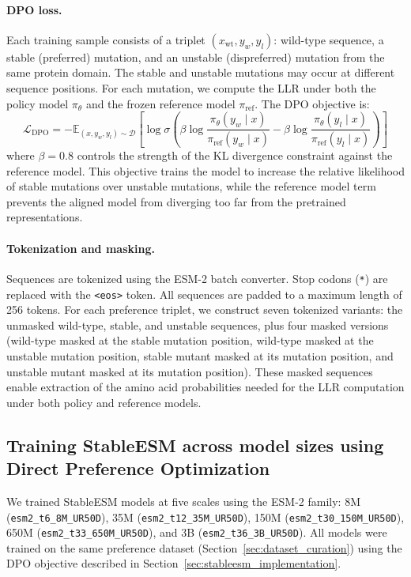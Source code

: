 \paragraph{DPO loss.}
Each training sample consists of a triplet $(x_{\text{wt}}, y_w, y_l)$: wild-type sequence, a stable (preferred) mutation, and an unstable (dispreferred) mutation from the same protein domain.
The stable and unstable mutations may occur at different sequence positions.
For each mutation, we compute the LLR under both the policy model $\pi_\theta$ and the frozen reference model $\pi_{\text{ref}}$.
The DPO objective is:
\begin{equation}
\mathcal{L}_{\text{DPO}} = -\mathbb{E}_{(x, y_w, y_l) \sim \mathcal{D}} \left[ \log \sigma \left( \beta \log \frac{\pi_\theta(y_w \mid x)}{\pi_{\text{ref}}(y_w \mid x)} - \beta \log \frac{\pi_\theta(y_l \mid x)}{\pi_{\text{ref}}(y_l \mid x)} \right) \right]
\end{equation}
where $\beta = 0.8$ controls the strength of the KL divergence constraint against the reference model.
This objective trains the model to increase the relative likelihood of stable mutations over unstable mutations, while the reference model term prevents the aligned model from diverging too far from the pretrained representations.

\paragraph{Tokenization and masking.}
Sequences are tokenized using the ESM-2 batch converter.
Stop codons (\texttt{*}) are replaced with the \texttt{<eos>} token.
All sequences are padded to a maximum length of 256 tokens.
For each preference triplet, we construct seven tokenized variants: the unmasked wild-type, stable, and unstable sequences, plus four masked versions (wild-type masked at the stable mutation position, wild-type masked at the unstable mutation position, stable mutant masked at its mutation position, and unstable mutant masked at its mutation position).
These masked sequences enable extraction of the amino acid probabilities needed for the LLR computation under both policy and reference models.

\subsection{Training StableESM across model sizes using Direct Preference Optimization}\label{sec:dpo_training}

We trained StableESM models at five scales using the ESM-2 family: 8M (\texttt{esm2\_t6\_8M\_UR50D}), 35M (\texttt{esm2\_t12\_35M\_UR50D}), 150M (\texttt{esm2\_t30\_150M\_UR50D}), 650M (\texttt{esm2\_t33\_650M\_UR50D}), and 3B (\texttt{esm2\_t36\_3B\_UR50D}).
All models were trained on the same preference dataset (Section~\ref{sec:dataset_curation}) using the DPO objective described in Section~\ref{sec:stableesm_implementation}.

